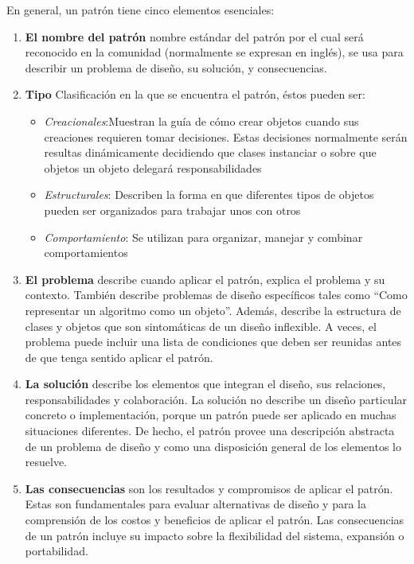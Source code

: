 En general, un patrón tiene cinco elementos esenciales:
        \begin{enumerate}
            \item \textbf{El nombre del patrón} nombre estándar del patrón por el cual será reconocido en la comunidad
(normalmente se expresan en inglés), se usa para describir un problema de diseño, su solución, y consecuencias.

            \item \textbf{Tipo} Clasificación en la que se encuentra el patrón, éstos pueden ser:
                \begin{itemize}
                    \item \textit{Creacionales}:Muestran la guía de cómo crear objetos cuando
sus creaciones requieren tomar decisiones. Estas decisiones normalmente serán resultas dinámicamente decidiendo que
clases instanciar o sobre que objetos un objeto delegará responsabilidades
                    \item \textit{Estructurales}: Describen la forma en que diferentes tipos de
objetos pueden ser organizados para trabajar unos con otros
                    \item \textit{Comportamiento}: Se utilizan para organizar, manejar y combinar comportamientos
                \end{itemize}

            \item \textbf{El problema} describe cuando aplicar el patrón, explica el problema y su contexto. También
                describe problemas de diseño específicos tales como ``Como representar un algoritmo como un objeto''.
                Además, describe la estructura de clases y objetos que son sintomáticas de un diseño inflexible. A
                veces, el problema puede incluir una lista de condiciones que deben ser reunidas antes de que tenga
                sentido aplicar el patrón. \item \textbf{La solución} describe los elementos que integran el
                diseño, sus relaciones, responsabilidades y colaboración. La solución no describe un diseño
                particular concreto o implementación, porque un patrón puede ser aplicado en muchas situaciones
                diferentes. De hecho, el patrón provee una descripción abstracta de un problema de diseño y
                como una disposición general de los elementos lo resuelve.
            \item \textbf{Las consecuencias} son los resultados y compromisos de aplicar el patrón. Estas son
                fundamentales para evaluar alternativas de diseño y para la comprensión de los costos y
                beneficios de aplicar el patrón. Las consecuencias de un patrón incluye su impacto sobre la
                flexibilidad del sistema, expansión o portabilidad.
        \end{enumerate}

